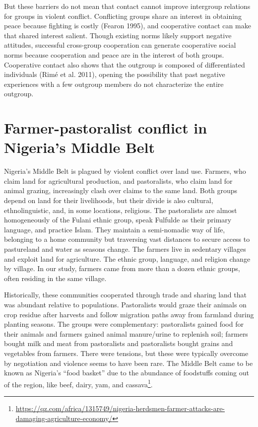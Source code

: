\documentclass[11pt]{article}
\begin{document}
But these barriers do not mean that contact cannot improve intergroup
relations for groups in violent conflict. Conflicting groups share an
interest in obtaining peace because fighting is costly (Fearon 1995),
and cooperative contact can make that shared interest salient. Though
existing norms likely support negative attitudes, successful cross-group
cooperation can generate cooperative social norms because cooperation
and peace are in the interest of both groups. Cooperative contact also
shows that the outgroup is composed of differentiated individuals (Rimé
et al. 2011), opening the possibility that past negative experiences
with a few outgroup members do not characterize the entire outgroup.

\hypertarget{farmer-pastoralist-conflict-in-nigerias-middle-belt}{%
\section{Farmer-pastoralist conflict in Nigeria's Middle
Belt}\label{farmer-pastoralist-conflict-in-nigerias-middle-belt}}

Nigeria's Middle Belt is plagued by violent conflict over land use.
Farmers, who claim land for agricultural production, and pastoralists,
who claim land for animal grazing, increasingly clash over claims to the
same land. Both groups depend on land for their livelihoods, but their
divide is also cultural, ethnolinguistic, and, in some locations,
religious. The pastoralists are almost homogeneously of the Fulani
ethnic group, speak Fulfulde as their primary language, and practice
Islam. They maintain a semi-nomadic way of life, belonging to a home
community but traversing vast distances to secure access to pastureland
and water as seasons change. The farmers live in sedentary villages and
exploit land for agriculture. The ethnic group, language, and religion
change by village. In our study, farmers came from more than a dozen
ethnic groups, often residing in the same village.

Historically, these communities cooperated through trade and sharing
land that was abundant relative to populations. Pastoralists would graze
their animals on crop residue after harvests and follow migration paths
away from farmland during planting seasons. The groups were
complementary: pastoralists gained food for their animals and farmers
gained animal manure/urine to replenish soil; farmers bought milk and
meat from pastoralists and pastoralists bought grains and vegetables
from farmers. There were tensions, but these were typically overcome by
negotiation and violence seems to have been rare. The Middle Belt came
to be known as Nigeria's ``food basket'' due to the abundance of
foodstuffs coming out of the region, like beef, dairy, yam, and
cassava\footnote{\url{https://qz.com/africa/1315749/nigeria-herdsmen-farmer-attacks-are-damaging-agriculture-economy/}}.
\end{document}
